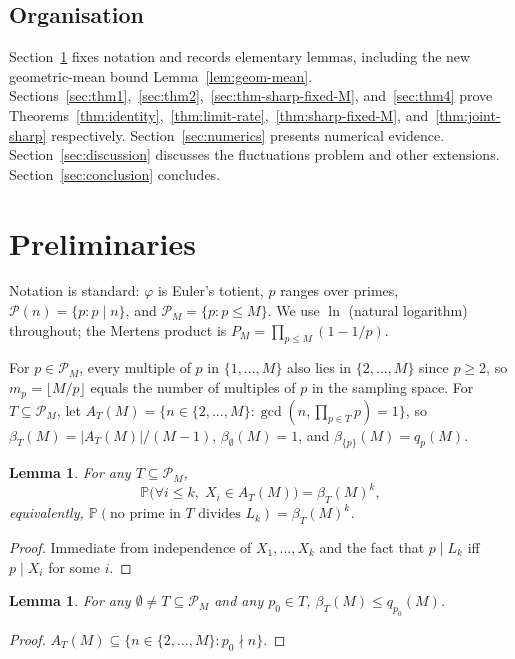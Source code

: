 \documentclass[11pt]{article}
\newtheorem{lemma}[theorem]{Lemma}
\theoremstyle{remark}
\newcommand{\gcdop}{\operatorname{gcd}}
\newcommand{\PP}{\mathbb{P}}
\newcommand{\PM}{\mathcal{P}_M}
\begin{document}
\subsection{Organisation}
Section~\ref{sec:prelim} fixes notation and records elementary lemmas, including the new geometric-mean bound Lemma~\ref{lem:geom-mean}. Sections~\ref{sec:thm1},~\ref{sec:thm2},~\ref{sec:thm-sharp-fixed-M}, and~\ref{sec:thm4} prove Theorems~\ref{thm:identity},~\ref{thm:limit-rate},~\ref{thm:sharp-fixed-M}, and~\ref{thm:joint-sharp} respectively. Section~\ref{sec:numerics} presents numerical evidence. Section~\ref{sec:discussion} discusses the fluctuations problem and other extensions. Section~\ref{sec:conclusion} concludes.

\section{Preliminaries}\label{sec:prelim}

Notation is standard: $\varphi$ is Euler's totient, $p$ ranges over primes, $\mathcal{P}(n) = \{p : p \mid n\}$, and $\PM = \{p : p \leq M\}$. We use $\ln$ (natural logarithm) throughout; the Mertens product is $P_M = \prod_{p \leq M}(1 - 1/p)$.

For $p \in \PM$, every multiple of $p$ in $\{1, \ldots, M\}$ also lies in $\{2, \ldots, M\}$ since $p \geq 2$, so $m_p = \lfloor M/p \rfloor$ equals the number of multiples of $p$ in the sampling space. For $T \subseteq \PM$, let $A_T(M) = \{n \in \{2, \ldots, M\} : \gcdop(n, \prod_{p \in T} p) = 1\}$, so $\beta_T(M) = |A_T(M)|/(M-1)$, $\beta_\emptyset(M) = 1$, and $\beta_{\{p\}}(M) = q_p(M)$.

\begin{lemma}\label{lem:betaT-power}
For any $T \subseteq \PM$,
\[
\PP\bigl(\forall i \leq k,\; X_i \in A_T(M)\bigr) = \beta_T(M)^k,
\]
equivalently, $\PP(\text{no prime in $T$ divides $L_k$}) = \beta_T(M)^k$.
\end{lemma}
\begin{proof}
Immediate from independence of $X_1, \ldots, X_k$ and the fact that $p \mid L_k$ iff $p \mid X_i$ for some $i$.
\end{proof}

\begin{lemma}\label{lem:single-prime}
For any $\emptyset \neq T \subseteq \PM$ and any $p_0 \in T$, $\beta_T(M) \leq q_{p_0}(M)$.
\end{lemma}
\begin{proof}
$A_T(M) \subseteq \{n \in \{2, \ldots, M\} : p_0 \nmid n\}$.
\end{proof}
\end{document}
